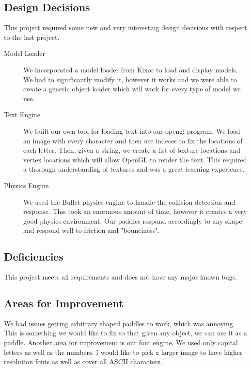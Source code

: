 \documentclass[10pt]{report}
\begin{document}
\subsection*{Design Decisions}
This project required some new and very interesting design decisions with respect to the last project.
\begin{description}
\item[Model Loader] We incorporated a model loader from Kixor to load and display models. We had to significantly
                   modify it, however it works and we were able to create a generic object loader which will
                   work for every type of model we use. 
\item[Text Engine] We built our own tool for loading text into our opengl program. We load an image with every
character and then use indeces to fix the locations of each letter. Then, given a string, we create a list of
texture locations and vertex locations which will allow OpenGL to render the text. This required a thorough 
understanding of textures and was a great learning experience. 

\item[Physics Engine] We used the Bullet physics engine to handle the collision detection and response. This
took an enormous amount of time, however it creates a very good physics environment. Our paddles respond 
accordingly to any shape and respond well to friction and "bounciness".
\end{description}

\subsection*{Deficiencies}
This project meets all requirements and does not have any major known bugs.

\subsection*{Areas for Improvement}
We had issues getting arbitrary shaped paddles to work, which was annoying. This is something we would like to
fix so that given any object, we can use it as a paddle.  Another area for improvement is our font engine. We
used only capital letters as well as the numbers. I would like to pick a larger image to have higher resolution
fonts as well as cover all ASCII characters. 
\end{document}
